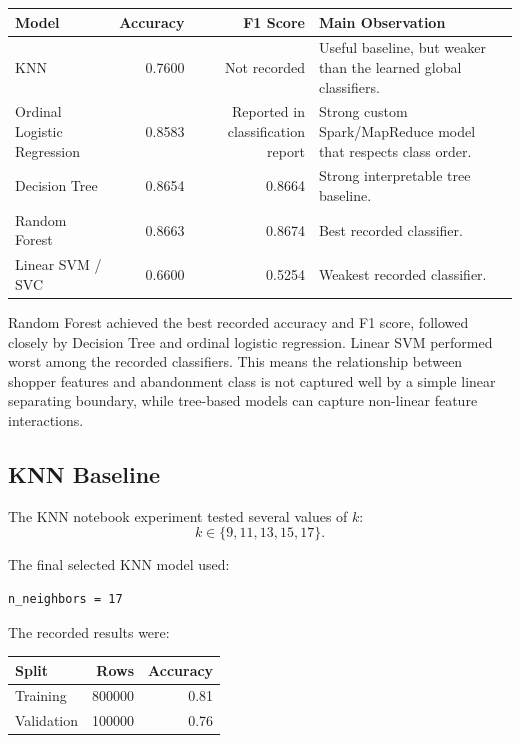 \documentclass[11pt,a4paper]{article}
\begin{document}
\begin{center}
\small
\begin{tabular}{p{}rrp{}}
\toprule
Model & Accuracy & F1 Score & Main Observation \\
\midrule
KNN & 0.7600 & Not recorded & Useful baseline, but weaker than the learned global classifiers. \\
Ordinal Logistic Regression & 0.8583 & Reported in classification report & Strong custom Spark/MapReduce model that respects class order. \\
Decision Tree & 0.8654 & 0.8664 & Strong interpretable tree baseline. \\
Random Forest & 0.8663 & 0.8674 & Best recorded classifier. \\
Linear SVM / SVC & 0.6600 & 0.5254 & Weakest recorded classifier. \\
\bottomrule
\end{tabular}
\end{center}
\normalsize

Random Forest achieved the best recorded accuracy and F1 score, followed closely by Decision Tree and ordinal logistic regression. Linear SVM performed worst among the recorded classifiers. This means the relationship between shopper features and abandonment class is not captured well by a simple linear separating boundary, while tree-based models can capture non-linear feature interactions.

\subsection{KNN Baseline}

The KNN notebook experiment tested several values of $k$:
\[
k \in \{9, 11, 13, 15, 17\}.
\]

The final selected KNN model used:
\begin{verbatim}
n_neighbors = 17
\end{verbatim}

The recorded results were:
\begin{center}
\begin{tabular}{lrr}
\toprule
Split & Rows & Accuracy \\
\midrule
Training & 800000 & 0.81 \\
Validation & 100000 & 0.76 \\
\bottomrule
\end{tabular}
\end{center}
\end{document}
